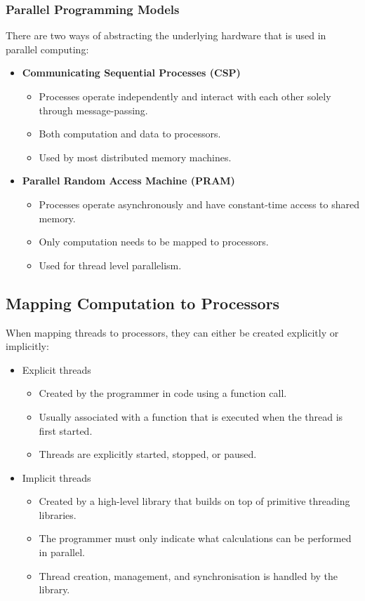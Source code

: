 \documentclass{article}
\begin{document}
\subsubsection{Parallel Programming Models}
There are two ways of abstracting the underlying hardware that is used
in parallel computing:
\begin{itemize}
    \item \textbf{Communicating Sequential Processes (CSP)}
          \begin{itemize}
              \item Processes operate independently and interact with
                    each other solely through message-passing.
              \item Both computation and data to processors.
              \item Used by most distributed memory machines.
          \end{itemize}
    \item \textbf{Parallel Random Access Machine (PRAM)}
          \begin{itemize}
              \item Processes operate asynchronously and have
                    constant-time access to shared memory.
              \item Only computation needs to be mapped to processors.
              \item Used for thread level parallelism.
          \end{itemize}
\end{itemize}
\subsection{Mapping Computation to Processors}
When mapping threads to processors, they can either be created
explicitly or implicitly:
\begin{itemize}
    \item Explicit threads
          \begin{itemize}
              \item Created by the programmer in code using a function
                    call.
              \item Usually associated with a function that is executed
                    when the thread is first started.
              \item Threads are explicitly started, stopped, or paused.
          \end{itemize}
    \item Implicit threads
          \begin{itemize}
              \item Created by a high-level library that builds on top
                    of primitive threading libraries.
              \item The programmer must only indicate what calculations
                    can be performed in parallel.
              \item Thread creation, management, and synchronisation is
                    handled by the library.
          \end{itemize}
\end{itemize}
\end{document}
